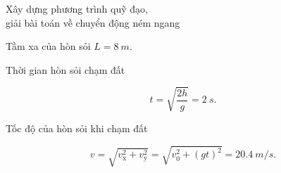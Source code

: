\begin{dang}{Xây dựng phương trình quỹ đạo, \\giải bài toán về chuyển động ném ngang}
{\begin{enumerate}[label=\alph*.]
			Tầm xa của hòn sỏi $L =\SI{8}{m}.$
			
			Thời gian hòn sỏi chạm đất
			
			$$t=\sqrt{\dfrac{2h}{g}} = \SI{2}{s}.$$
			
			Tốc độ của hòn sỏi khi chạm đất 
			
			$$v=\sqrt{v^2_{\text{x}} + v^2_{\text{y}}} = \sqrt{v^2_0+ (gt)^2} = \SI{20,4}{m/s}.$$
		\end{enumerate}
	}
\end{dang}